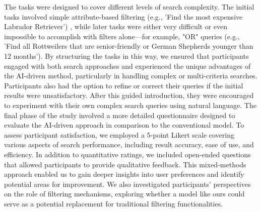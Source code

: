 \documentclass[../../submission.tex]{subfiles}
\begin{document}
  The tasks were designed to cover different levels of search complexity. The initial tasks involved simple 
  attribute-based filtering (e.g., 'Find the most expensive Labrador Retriever') , while later tasks were either 
  very difficult or even impossible to accomplish with filters alone—for example, "OR" queries 
  (e.g., 'Find all Rottweilers that are senior-friendly or German Shepherds younger than 12 months'). 
  By structuring the tasks in this way, we ensured that participants engaged with both search approaches 
  and experienced the unique advantages of the AI-driven method, particularly in handling complex or multi-criteria searches. 
  Participants also had the option to refine or correct their queries if the initial results were unsatisfactory. After this
   guided introduction, they were encouraged to experiment with their own complex search queries using natural language. The 
   final phase of the study involved a more detailed questionnaire designed to evaluate the AI-driven approach in comparison 
   to the conventional model. To assess participant satisfaction, we employed a 5-point Likert scale covering various aspects 
   of search performance, including result accuracy, ease of use, and efficiency. In addition to quantitative ratings, we 
   included open-ended questions that allowed participants to provide qualitative feedback. This mixed-methods approach 
   enabled us to gain deeper insights into user preferences and identify potential areas for improvement. We also investigated 
   participants' perspectives on the role of filtering mechanisms, exploring whether a model like ours could serve as a potential 
   replacement for traditional filtering functionalities.
\end{document}
